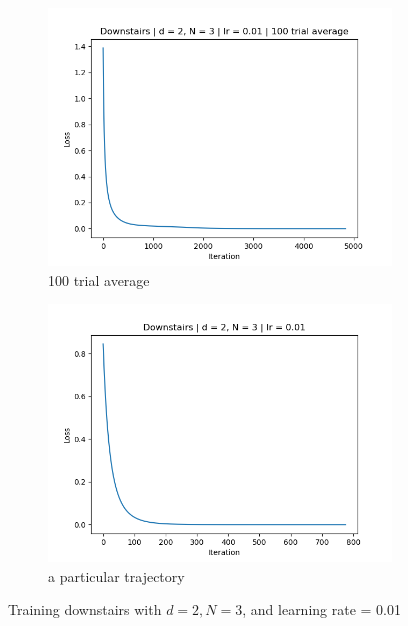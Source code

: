 \documentclass[11pt]{article}
\begin{document}
\begin{figure}[ht]
    \begin{subfigure}{0.5\textwidth}
        \centering
        \includegraphics[width=\textwidth]{images/downstairs_avg_lr1e-2.png}
        \caption{100 trial average}
        \label{fig:downstairs_avg}
    \end{subfigure}
    \begin{subfigure}{0.5\textwidth}
        \centering
        \includegraphics[width=\textwidth]{images/downstairs_1_lr1e-2.png}
        \caption{a particular trajectory}
        \label{fig:downstairs_1}
    \end{subfigure}
    \caption{Training downstairs with $d = 2, N = 3$, and learning rate = 0.01}
    \label{fig:downstairs}
\end{figure}
\end{document}
